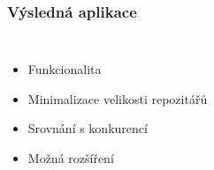 \documentclass[10pt,xcolor=pdflatex]{beamer}
\begin{document}
\begin{frame}\frametitle{Výsledná aplikace}
    \begin{columns}
            \begin{itemize}
                \item {Funkcionalita}
                \item {Minimalizace velikosti repozitářů}
                \item {Srovnání s konkurencí}
                \item {Možná rozšíření}
            \end{itemize}
    \end{columns}
\end{frame}
\end{document}
